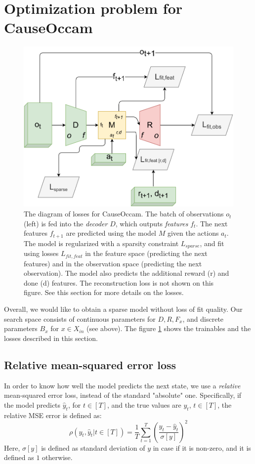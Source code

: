 \documentclass[a4paper,11pt,oneside]{report}
\newcommand{\sysname}{CauseOccam\xspace}
\begin{document}
\section{Optimization problem for \sysname}
\begin{figure}[h]
    \centering
    \includegraphics[width=0.7\linewidth]{diagrams/architecture_losses}
    \caption{The diagram of losses for \sysname. The batch of observations $o_t$ (left) is fed into the {\em decoder} $D$, which outputs {\em features} $f_t$. The next features $f_{t+1}$ are predicted using the model $M$ given the actions $a_t$. The model is regularized with a sparsity constraint $L_{sparse}$, and fit using losses $L_{fit,feat}$ in the feature space (predicting the next features) and in the observation space (predicting the next observation). The model also predicts the additional reward (r) and done (d) features. The reconstruction loss is not shown on this figure. See this section for more details on the losses.}
    \label{fig:architecture_losses}
\end{figure}


Overall, we would like to obtain a sparse model without loss of fit quality. Our search space consists of continuous parameters for $D,R,F_x$, and discrete parameters $B_x$ for $x\in X_{in}$ (see above). The figure \ref{fig:architecture_losses} shows the trainables and the losses described in this section.

\subsection{Relative mean-squared error loss}
In order to know how well the model predicts the next state, we use a {\em relative} mean-squared error loss, instead of the standard "absolute" one. Specifically, if the model predicts $\hat{y}_t$, for $t\in[T]$, and the true values are $y_t$, $t\in[T]$, the relative MSE error is defined as:
\begin{equation}
\label{eq:rel_mse}
\rho(y_t, \hat{y}_t|t\in[T])=\frac{1}{T}\sum\limits_{t=1}^T\left(\frac{y_t-\hat{y}_t}{\sigma[y]}\right)^2
\end{equation}
Here, $\sigma[y]$ is defined as standard deviation of $y$ in case if it is non-zero, and it is defined as $1$ otherwise.
\end{document}
